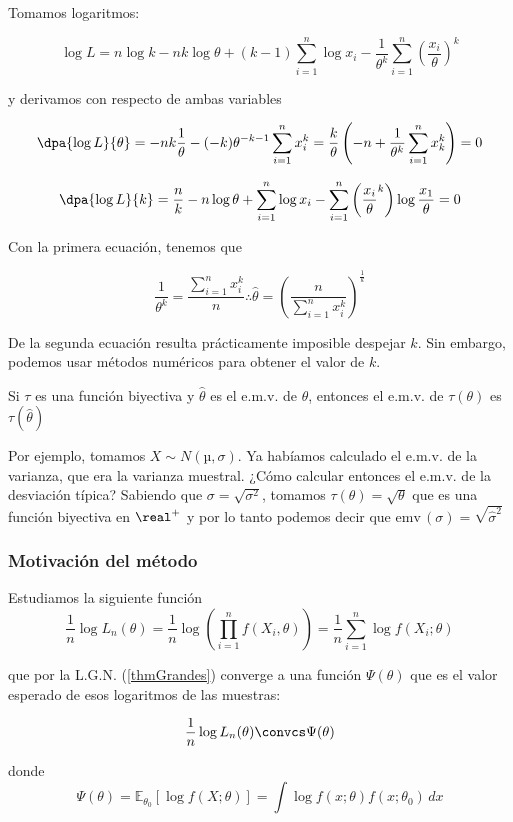 \documentclass{apuntes}
\begin{document}
Tomamos logaritmos:

\[ \log L = n\log k - nk\log \theta + (k-1)\sum_{i=1}^n\log x_i - \frac{1}{\theta^k} \sum_{i=1}^n \left(\frac{x_i}{\theta}\right)^k\]

y derivamos con respecto de ambas variables

\[ \dpa{\log L}{\theta} = -nk \frac{1}{\theta} - (-k) \theta^{-k-1} \sum_{i=1}^nx_i^k = \frac{k}{\theta}\left(-n + \frac{1}{\theta^k}\sum_{i=1}^nx_k^k\right) = 0 \]

\[ \dpa{\log L}{k} = \frac{n}{k} -n\log\theta + \sum_{i=1}^n \log x_i - \sum_{i=1}^n\left(\frac{x_i}{\theta}^k\right) \log\frac{x_1}{\theta} = 0 \]

Con la primera ecuación, tenemos que

\[ \frac{1}{\theta^k} = \frac{\sum_{i=1}^n x_i^k}{n} \therefore \hat{\theta} = \left(\frac{n}{\sum_{i=1}^n x_i^k}\right)^\frac{1}{k} \]

De la segunda ecuación resulta prácticamente imposible despejar $k$. Sin embargo, podemos usar métodos numéricos para obtener el valor de $k$. 

\begin{theorem} Si $\tau$ es una función biyectiva y $\hat{\theta}$ es el e.m.v. de $\theta$, entonces el e.m.v. de $\tau(\theta)$ es $\tau(\hat\theta)$
\end{theorem}

Por ejemplo, tomamos $X\sim N(µ, \sigma)$. Ya habíamos calculado el e.m.v. de la varianza, que era la varianza muestral. ¿Cómo calcular entonces el e.m.v. de la desviación típica? Sabiendo que $\sigma = \sqrt{\sigma^2}$, tomamos $\tau(\theta) = \sqrt{\theta}$ que es una función biyectiva en $\real^+$ y por lo tanto podemos decir que $\text{emv}\,(\sigma) = \sqrt{\hat\sigma^2}$

\subsubsection{Motivación del método}
Estudiamos la siguiente función
\[ \frac{1}{n}\log L_n(\theta) = \frac{1}{n} \log \left(\prod_{i=1}^nf(X_i,\theta)\right) = \frac{1}{n}\sum_{i=1}^n \log f(X_i;\theta) \]

que por la L.G.N. (\ref{thmGrandes}) converge a una función $\Psi(\theta)$ que es el valor esperado de esos logaritmos de las muestras:

\[ \frac{1}{n}\log L_n(\theta) \convcs \Psi(\theta) \]

donde \[ \Psi(\theta) = \mathbb{E}_{\theta_0} \left[\log f(X;\theta)\right] = \int\log f(x;\theta) f(x;\theta_0) \, dx \]
\end{document}
